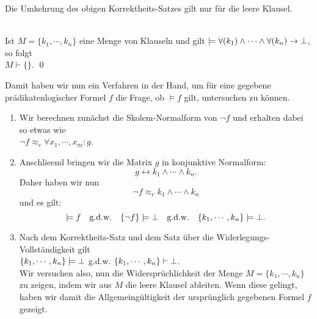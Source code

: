 \noindent
Die Umkehrung des obigen Korrektheits-Satzes gilt nur f\"{u}r die leere Klausel.
\begin{Satz} \hspace*{\fill} \\
  Ist $M = \{k_1,\cdots,k_n\}$ eine Menge von Klauseln und gilt 
  $\models \forall(k_1) \wedge \cdots \wedge \forall(k_n) \rightarrow \bot$, so folgt \\[0.2cm]
  \hspace*{1.3cm} $M \vdash \{\}$.
    \qed
\end{Satz}
\noindent
Damit haben wir nun ein Verfahren in der Hand, um f\"{u}r eine gegebene 
pr\"{a}dikatenlogischer Formel $f$ die Frage, ob $\models f$ gilt, untersuchen zu k\"{o}nnen.
\begin{enumerate}
\item Wir berechnen zun\"{a}chst die Skolem-Normalform von $\neg f$ und erhalten dabei so etwas wie \\[0.2cm]
      \hspace*{1.3cm} $\neg f \approx_e \forall x_1, \cdots, x_m \colon g$.
\item Anschlie\3end bringen wir die Matrix $g$ in konjunktive Normalform: 
      \[ g \leftrightarrow k_1 \wedge \cdots \wedge k_n. \]
      Daher haben wir nun 
      \[ \neg f \approx_e k_1 \wedge \cdots \wedge k_n \] 
      und es gilt: 
      \[  
          \models f                           \quad \mbox{g.d.w.} \quad
          \{\neg f\} \models \bot          \quad \mbox{g.d.w.} \quad 
          \{k_1,\cdots,k_n\} \models \bot.
      \]
\item Nach dem Korrektheits-Satz und dem Satz \"{u}ber die Widerlegungs-Vollst\"{a}ndigkeit gilt
      \\[0.2cm]
      \hspace*{1.3cm} 
      $\{k_1,\cdots,k_n\} \models \bot$ \quad g.d.w. \quad 
      $\{k_1,\cdots,k_n\} \vdash \bot$. \\[0.2cm]
      Wir versuchen also, nun die Widerspr\"{u}chlichkeit der Menge $M = \{ k_1, \cdots, k_n \}$  zu zeigen, indem wir
      aus $M$ die leere Klausel ableiten.
      Wenn diese gelingt, haben wir damit die Allgemeing\"{u}ltigkeit der urspr\"{u}nglich
      gegebenen Formel $f$ gezeigt.
\end{enumerate}


